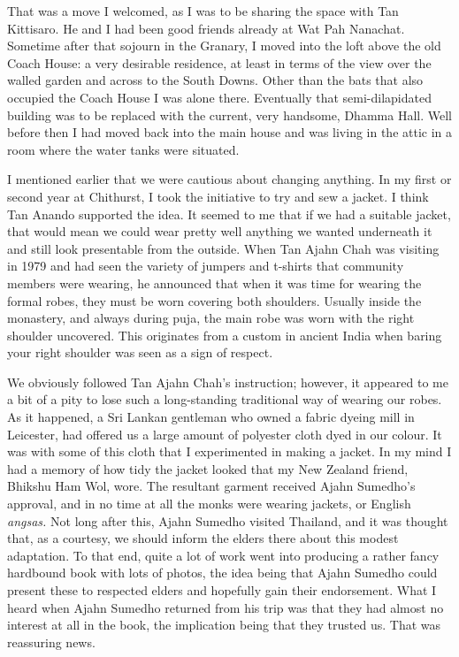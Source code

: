 That was a move I welcomed, as I was to be sharing the space with Tan
Kittisaro. He and I had been good friends already at Wat Pah Nanachat.
Sometime after that sojourn in the Granary, I moved into the loft above
the old Coach House: a very desirable residence, at least in terms of
the view over the walled garden and across to the South Downs. Other
than the bats that also occupied the Coach House I was alone there.
Eventually that semi-dilapidated building was to be replaced with the
current, very handsome, Dhamma Hall. Well before then I had moved back
into the main house and was living in the attic in a room where the
water tanks were situated.

I mentioned earlier that we were cautious about changing anything. In my
first or second year at Chithurst, I took the initiative to try and sew
a jacket. I think Tan Anando supported the idea. It seemed to me that if
we had a suitable jacket, that would mean we could wear pretty well
anything we wanted underneath it and still look presentable from the
outside. When Tan Ajahn Chah was visiting in 1979 and had seen the
variety of jumpers and t-shirts that community members were wearing, he
announced that when it was time for wearing the formal robes, they must
be worn covering both shoulders. Usually inside the monastery, and
always during puja, the main robe was worn with the right shoulder
uncovered. This originates from a custom in ancient India when baring
your right shoulder was seen as a sign of respect.

We obviously followed Tan Ajahn Chah's instruction; however, it appeared
to me a bit of a pity to lose such a long-standing traditional way of
wearing our robes. As it happened, a Sri Lankan gentleman who owned a
fabric dyeing mill in Leicester, had offered us a large amount of
polyester cloth dyed in our colour. It was with some of this cloth that
I experimented in making a jacket. In my mind I had a memory of how tidy
the jacket looked that my New Zealand friend, Bhikshu Ham Wol, wore. The
resultant garment received Ajahn Sumedho's approval, and in no time at
all the monks were wearing jackets, or English \emph{angsas.} Not long
after this, Ajahn Sumedho visited Thailand, and it was thought that, as
a courtesy, we should inform the elders there about this modest
adaptation. To that end, quite a lot of work went into producing a
rather fancy hardbound book with lots of photos, the idea being that
Ajahn Sumedho could present these to respected elders and hopefully gain
their endorsement. What I heard when Ajahn Sumedho returned from his
trip was that they had almost no interest at all in the book, the
implication being that they trusted us. That was reassuring news.

